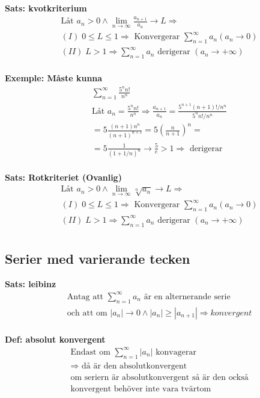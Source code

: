 \begin{multicols}{2}
\textbf{Sats: kvotkriterium}
\begin{align*}
  &\text{Låt } a_n>0 \land \lim_{n\to{\infty}}\frac{a_{n+1}}{a_n}\to L \Rightarrow \\
  &(I) \; 0 \leq L \leq 1 \Rightarrow \text{ Konvergerar } \displaystyle\sum_{n=1}^{\infty}a_n
  (a_n \to 0) \\
  &(II) \; L>1 \Rightarrow \displaystyle\sum_{n=1}^{\infty}a_n \text{ derigerar }
  (a_n \to +\infty) \\
\end{align*}

\textbf{Exemple: Måste kunna}
\begin{align*}
  &\displaystyle\sum_{n=1}^{\infty}\frac{5^n n!}{n^n} \\
  &\text{Låt } a_n = \frac{5^n n!}{n^n} \Rightarrow \frac{a_{n+1}}{a_n} =
  \frac{5^{n+1}(n+1)!/n^n}{5^n n!/n^n} \\
  &= 5 \frac{(n+1)n^n}{{(n+1)}^{n+1}} = 5 {(\frac{n}{n+1})}^n = \\
  &= 5 \frac{1}{{(1+1/n)}^n} \to \frac{5}{e} > 1 \Rightarrow \text{ derigerar}\\
\end{align*}


\textbf{Sats: Rotkriteriet (Ovanlig)}
\begin{align*}
  &\text{Låt } a_n>0 \land \lim_{n\to{\infty}}\sqrt[n]{a_n} \to L \Rightarrow \\
  &(I) \; 0 \leq L \leq 1 \Rightarrow \text{ Konvergerar } \displaystyle\sum_{n=1}^{\infty}a_n
  (a_n \to 0) \\
  &(II) \; L>1 \Rightarrow \displaystyle\sum_{n=1}^{\infty}a_n \text{ derigerar }
  (a_n \to +\infty) \\
\end{align*}

\subsection{Serier med varierande tecken}
\textbf{Sats: leibinz}
\begin{align*}
  &\text{Antag att } \displaystyle\sum_{n=1}^{\infty}a_n \text{ är en alternerande serie } \\
  &\text{och att om } |a_n| \to 0 \land |a_n|\geq|a_{n+1}| \Rightarrow konvergent \\
\end{align*}

\textbf{Def: absolut konvergent}
\begin{align*}
  &\text{Endast om } \displaystyle\sum_{n=1}^{\infty}|a_n| \text{ konvagerar } \\
  &\Rightarrow
  \text{ då är den absolutkonvergent} \\
  &\text{om seriern är absolutkonvergent så är den också} \\
  &\text{konvergent behöver inte vara tvärtom} \\
\end{align*}



\end{multicols}
